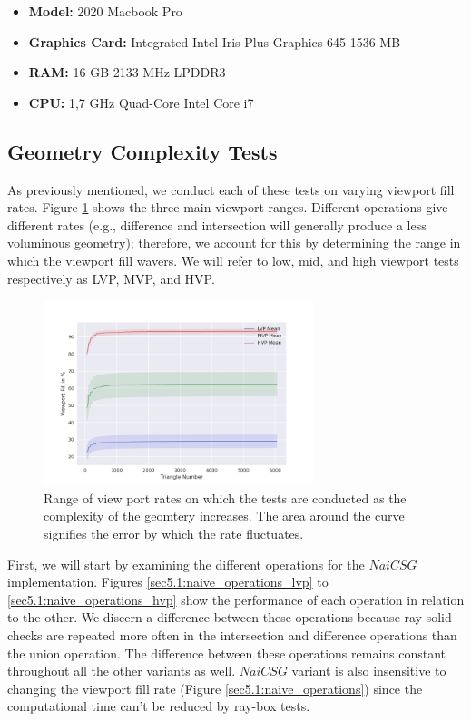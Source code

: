 \documentclass[a4paper,11pt,oneside]{article}
\begin{document}
\begin{itemize}
	\item \textbf{Model:} 2020 Macbook Pro
	\item \textbf{Graphics Card:} Integrated Intel Iris Plus Graphics 645 1536 MB
	\item \textbf{RAM:} 16 GB 2133 MHz LPDDR3
	\item \textbf{CPU:} 1,7 GHz Quad-Core Intel Core i7
\end{itemize}


\subsection{Geometry Complexity Tests}

As previously mentioned, we conduct each of these tests on varying viewport fill rates. Figure \ref{sec5.1:viewport_range} shows the three main viewport ranges. Different operations give different rates (e.g., difference and intersection will generally produce a less voluminous geometry); therefore, we account for this by determining the range in which the viewport fill wavers. We will refer to low, mid, and high viewport tests respectively as LVP, MVP, and HVP.

\begin{figure}[H] 
	\begin{center}
		\includegraphics[width=0.7\textwidth]{section5/plots/view_port_final.png}
	\end{center}
	\caption{Range of view port rates on which the tests are conducted as the complexity of the geomtery increases. The area around the curve signifies the error by which the rate fluctuates.}
	\label{sec5.1:viewport_range}
\end{figure}


First, we will start by examining the different operations for the $NaiCSG$ implementation. Figures \ref{sec5.1:naive_operations_lvp} to \ref{sec5.1:naive_operations_hvp} show the performance of each operation in relation to the other. We discern a difference between these operations because ray-solid checks are repeated more often in the intersection and difference operations than the union operation. The difference between these operations remains constant throughout all the other variants as well. $NaiCSG$ variant is also insensitive to changing the viewport fill rate (Figure \ref{sec5.1:naive_operations}) since the computational time can't be reduced by ray-box tests.
\end{document}

